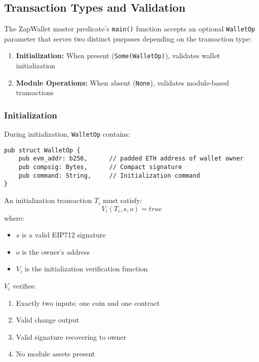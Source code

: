 \subsection{Transaction Types and Validation}

The ZapWallet master predicate's \texttt{main()} function accepts an optional \texttt{WalletOp} parameter that serves two distinct purposes depending on the transaction type:

\begin{enumerate}
    \item \textbf{Initialization:} When present (\texttt{Some(WalletOp)}), validates wallet initialization
    \item \textbf{Module Operations:} When absent (\texttt{None}), validates module-based transactions
\end{enumerate}




\subsubsection{Initialization}
During initialization, \texttt{WalletOp} contains:

\begin{small}
\begin{verbatim}
pub struct WalletOp {
    pub evm_addr: b256,      // padded ETH address of wallet owner
    pub compsig: Bytes,      // Compact signature
    pub command: String,     // Initialization command
}
\end{verbatim}
\end{small}

An initialization transaction $T_i$ must satisfy:
\[ V_i(T_i, s, o) = true \]
where:
\begin{itemize}
    \item $s$ is a valid EIP712 signature
    \item $o$ is the owner's address
    \item $V_i$ is the initialization verification function
\end{itemize}

$V_i$ verifies:
\begin{enumerate}
    \item Exactly two inputs: one coin and one contract
    \item Valid change output
    \item Valid signature recovering to owner
    \item No module assets present
\end{enumerate}





